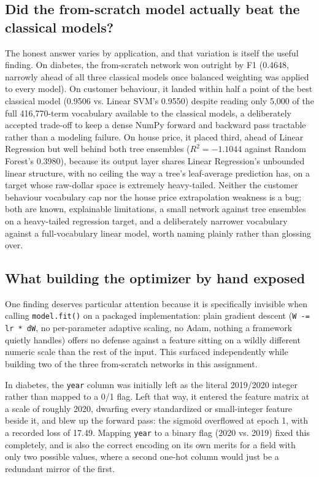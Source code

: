 \documentclass[11pt]{article}
\newcommand{\code}[1]{\texttt{#1}}
\begin{document}
\subsection{Did the from-scratch model actually beat the classical models?}

The honest answer varies by application, and that variation is itself the useful finding.
On diabetes, the from-scratch network won outright by F1 (0.4648, narrowly ahead of all
three classical models once balanced weighting was applied to every model). On customer
behaviour, it landed within half a point of the best classical model (0.9506 vs. Linear
SVM's 0.9550) despite reading only 5,000 of the full 416,770-term vocabulary available to
the classical models, a deliberately accepted trade-off to keep a dense NumPy forward and
backward pass tractable rather than a modeling failure. On house price, it placed third,
ahead of Linear Regression but well behind both tree ensembles ($R^2 = -1.1044$ against
Random Forest's 0.3980), because its output layer shares Linear Regression's unbounded
linear structure, with no ceiling the way a tree's leaf-average prediction has, on a target
whose raw-dollar space is extremely heavy-tailed. Neither the customer behaviour vocabulary
cap nor the house price extrapolation weakness is a bug; both are known, explainable
limitations, a small network against tree ensembles on a heavy-tailed regression target,
and a deliberately narrower vocabulary against a full-vocabulary linear model, worth naming
plainly rather than glossing over.

\subsection{What building the optimizer by hand exposed}

One finding deserves particular attention because it is specifically invisible when calling
\code{model.fit()} on a packaged implementation: plain gradient descent
(\texttt{W -= lr * dW}, no per-parameter adaptive scaling, no Adam, nothing a framework
quietly handles) offers no defense against a feature sitting on a wildly different numeric
scale than the rest of the input. This surfaced independently while building two of the
three from-scratch networks in this assignment.

In diabetes, the \verb|year| column was initially left as the literal 2019/2020 integer
rather than mapped to a 0/1 flag. Left that way, it entered the feature matrix at a scale of
roughly 2020, dwarfing every standardized or small-integer feature beside it, and blew up
the forward pass: the sigmoid overflowed at epoch 1, with a recorded loss of 17.49. Mapping
\verb|year| to a binary flag (2020 vs. 2019) fixed this completely, and is also the correct
encoding on its own merits for a field with only two possible values, where a second one-hot
column would just be a redundant mirror of the first.
\end{document}
